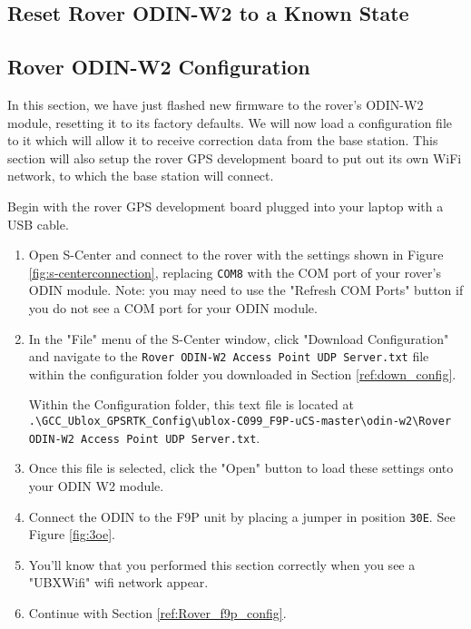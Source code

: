 \documentclass{article}%
\begin{document}
\subsection{Reset Rover ODIN-W2 to a Known State}

\subsection{Rover ODIN-W2 Configuration}
In this section, we have just flashed new firmware to the rover's ODIN-W2 module, resetting it to its factory defaults.  We will now load a configuration file to it which will allow it to receive correction data from the base station.  This section will also setup the rover GPS development board to put out its own WiFi network, to which the base station will connect.

Begin with the rover GPS development board plugged into your laptop with a USB cable.

\begin{enumerate}
\item Open S-Center and connect to the rover with the settings shown in Figure \ref{fig:s-centerconnection}, replacing \texttt{COM8} with the COM port of your rover's ODIN module. Note: you may need to use the "Refresh COM Ports" button if you do not see a COM port for your ODIN module.
\item In the "File" menu of the S-Center window, click "Download Configuration" and navigate to the \texttt{Rover ODIN-W2 Access Point UDP Server.txt} file within the configuration folder you downloaded in Section \ref{ref:down_config}.

	Within the Configuration folder, this text file is located at \\ \texttt{.\textbackslash GCC\_Ublox\_GPSRTK\_Config\textbackslash ublox-C099\_F9P-uCS-master\textbackslash odin-w2\textbackslash Rover ODIN-W2 Access Point UDP Server.txt}.
\item Once this file is selected, click the "Open" button to load these settings onto your ODIN W2 module.
\item Connect the ODIN to the F9P unit by placing a jumper in position \texttt{30E}. See Figure \ref{fig:3oe}.
\item You'll know that you performed this section correctly when you see a "UBXWifi" wifi network appear.
\item Continue with Section \ref{ref:Rover_f9p_config}.
\end{enumerate}
\end{document}
